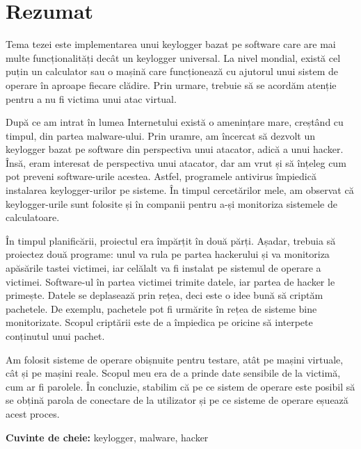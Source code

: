 \chapter*{Rezumat}
Tema tezei este implementarea unui keylogger bazat pe software care are mai multe funcționalități decât un keylogger universal. La nivel mondial, există cel puțin un calculator sau o mașină care funcționează cu ajutorul unui sistem de operare în aproape fiecare clădire. Prin urmare, trebuie să se acordăm atenție pentru a nu fi victima unui atac virtual.

După ce am intrat în lumea Internetului există o amenințare mare, creștând cu timpul, din partea malware-ului. Prin uramre, am încercat să dezvolt un keylogger bazat pe software din perspectiva unui atacator, adică a unui hacker. Însă, eram interesat de perspectiva unui atacator, dar am vrut și să înțeleg cum pot preveni software-urile acestea. Astfel, programele antivirus împiedică instalarea keylogger-urilor pe sisteme. În timpul cercetărilor mele, am observat că keylogger-urile sunt folosite și în companii pentru a-și monitoriza sistemele de calculatoare.

În timpul planificării, proiectul era împărțit în două părți. Așadar, trebuia să proiectez două programe: unul va rula pe partea hackerului și va monitoriza apăsările tastei victimei, iar celălalt va fi instalat pe sistemul de operare a victimei. Software-ul în partea victimei trimite datele, iar partea de hacker le primește. Datele se deplasează prin rețea, deci este o idee bună să criptăm pachetele. De exemplu, pachetele pot fi urmărite în rețea de sisteme bine monitorizate. Scopul criptării este de a împiedica pe oricine să interpete conținutul unui pachet.

Am folosit sisteme de operare obișnuite pentru testare, atât pe mașini virtuale, cât și pe mașini reale. Scopul meu era de a prinde date sensibile de la victimă, cum ar fi parolele. În concluzie, stabilim că pe ce sistem de operare este posibil să se obțină parola de conectare de la utilizator și pe ce sisteme de operare eșuează acest proces.

\vspace*{2cm}


\noindent \textbf{Cuvinte de cheie:} keylogger, malware, hacker

\vfill
{}


